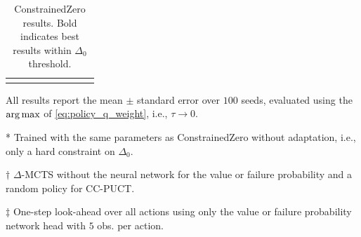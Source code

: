 \begin{table}[b!]
\begin{threeparttable}
\begin{adjustbox}{max width=\textwidth}
\begin{tabular}{@{}lrrrrrrrr@{}}
            \arrayrulecolor{black}
            \bottomrule
        \end{tabular}
        \end{adjustbox}
        \begin{scriptsize}
            \begin{tablenotes}
                \linespread{1.05}\selectfont %
                \item[\!\!] {All results report the mean $\pm$ standard error over $100$ seeds, evaluated using the $\argmax$ of \protect\cref{eq:policy_q_weight}, i.e., $\tau \to 0$.}
                \item[*] {Trained with the same parameters as ConstrainedZero without adaptation, i.e., only a hard constraint on $\Delta_0$.}
                \item[$\dagger$] {$\Delta$-MCTS without the neural network for the value or failure probability and a random policy for CC-PUCT.}
                \item[$\ddagger$] {One-step look-ahead over all actions using only the value or failure probability network head with $5$ obs. per action.}
            \end{tablenotes}
        \end{scriptsize}
    \end{threeparttable}
    \caption{ConstrainedZero results. Bold indicates best results within $\Delta_0$ threshold.}
    \label{tab:cz_results}    
\end{table}



